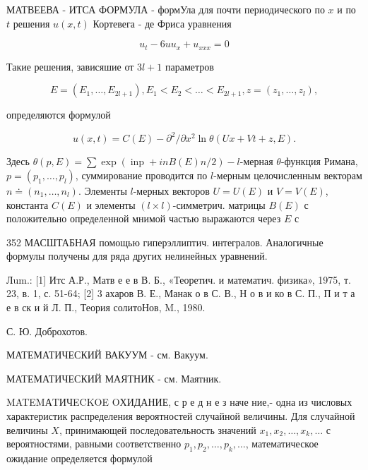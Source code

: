 \documentclass[10pt]{article}
\begin{document}
МАТВЕЕВА - ИТСА ФОРМУЛА - формУла для почти периодического по $x$ и по $t$ решения $u(x, t)$ Кортевега - де Фриса уравнения



\[

u_{t}-6 u u_{x}+u_{x x x}=0

\]



Такие решения, зависяшие от $3 l+1$ параметров



\[

E=\left(E_{1}, \ldots, E_{2 l+1}\right), E_{1}<E_{2}<\ldots<E_{2 l+1}, z=\left(z_{1}, \ldots, z_{l}\right),

\]



определяются формулой



\[

u(x, t)=C(E)-\partial^{2} / \partial x^{2} \ln \theta(U x+V t+z, E) .

\]



Здесь $\theta(p, E)=\sum \exp (\operatorname{inp}+i n B(E) n / 2)-l$-мерная $\theta$-функция Римана, $p=\left(p_{1}, \ldots, p_{l}\right)$, суммирование проводится по $l$-мерным целочисленным векторам $n \doteq\left(n_{1}, \ldots, n_{l}\right)$. Элементы $l$-мерных векторов $U=U(E)$ и $V=V(E)$, константа $C(E)$ и элементы $(l \times l)$-симметрич. матрицы $B(E)$ с положительно определенной мнимой частью выражаются через $E$ с



352 МАСШТАБНАЯ помощью гиперэллиптич. интегралов. Аналогичные формулы получены для ряда других нелинейных уравнений.



Лum.: [1] Итс А.Р., Матв е е в В. Б., «Теоретич. и математич. физика», 1975, т. 23, в. 1, с. 51-64; [2] 3 ахаров В. Е., Манак о в С. В., Н о в и ко в С. П., П и т а е в ск и й Л. П., Теория солитоНов, M., 1980.



С. Ю. Доброхотов.



МАТЕМАТИЧЕСКИЙ ВАКУУМ - см. Вакуум.



МАТЕМАТИЧЕСКИЙ МАЯТНИК - см. Маятник.



MATEMАTИЧECKOE OХИДАНИЕ, с р е д н е з наче ние,- одна из числовых характеристик распределения вероятностей случайной величины. Для случайной величины $X$, принимающей последовательность значений $x_{1}, x_{2}, \ldots, x_{k}, \ldots$ с вероятностями, равными соответственно $p_{1}, p_{2}, \ldots, p_{k}, \ldots$, математическое ожидание определяется формулой
\end{document}
